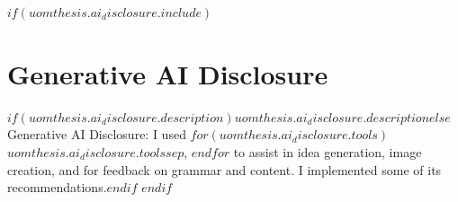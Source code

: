 $if(uomthesis.ai_disclosure.include)$
\chapter*{Generative AI Disclosure}

$if(uomthesis.ai_disclosure.description)$$uomthesis.ai_disclosure.description$$else$Generative AI Disclosure: I used $for(uomthesis.ai_disclosure.tools)$$uomthesis.ai_disclosure.tools$$sep$, $endfor$ to assist in idea generation, image creation, and for feedback on grammar and content. I implemented some of its recommendations.$endif$
$endif$
